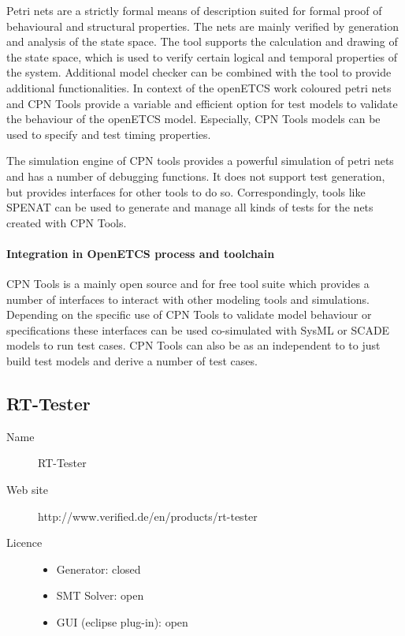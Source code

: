 Petri nets are a strictly formal means of description suited for formal proof of behavioural and structural properties. The nets are mainly verified by generation and analysis of the state space. The tool supports the calculation and drawing of the state space, which is used to verify certain logical and temporal properties of the system. Additional model checker can be combined with the tool to provide additional functionalities. In context of the openETCS work coloured petri nets and CPN Tools provide a variable and efficient option for test models to validate the behaviour of the openETCS model. Especially, CPN Tools models can be used to specify and test timing properties.

The simulation engine of CPN tools provides a powerful simulation of petri nets and has a number of debugging functions. It does not support test generation, but provides interfaces for other tools to do so. Correspondingly, tools like SPENAT can be used to generate and manage all kinds of tests for the nets created with CPN Tools. 

\paragraph{Integration in OpenETCS process and toolchain}

CPN Tools is a mainly open source and for free tool suite which provides a number of interfaces to interact with other modeling tools and simulations. Depending on the specific use of CPN Tools to validate model behaviour or specifications these interfaces can be used co-simulated with SysML or SCADE models to run test cases. CPN Tools can also be as an independent to to just build test models and derive a number of test cases. 

\subsection{RT-Tester}

\begin{description}
\item[Name] RT-Tester
\item[Web site] http://www.verified.de/en/products/rt-tester
\item[Licence] 
  \begin{itemize}
    \item Generator:  closed
    \item SMT Solver: open
    \item GUI (eclipse plug-in): open
  \end{itemize}
\end{description}

